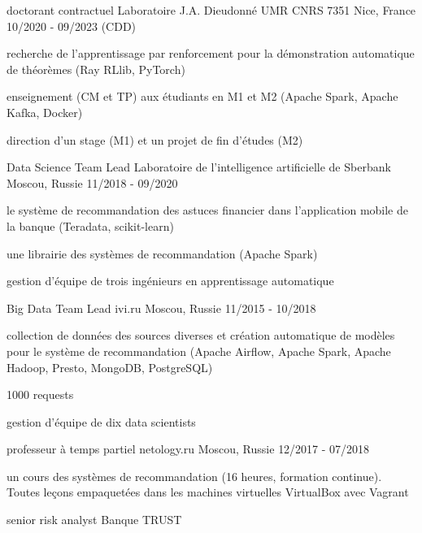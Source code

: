 \begin{cventries}
  \cventry
    {doctorant contractuel}
    {Laboratoire J.A. Dieudonné UMR CNRS 7351}
    {Nice, France}
    {10/2020 - 09/2023 (CDD)}
    {
      \begin{cvitems}
        \item {recherche de l'apprentissage par renforcement pour la démonstration automatique de théorèmes (Ray RLlib, PyTorch)}
        \item {enseignement (CM et TP) aux étudiants en M1 et M2 (Apache Spark, Apache Kafka, Docker)}
        \item {direction d'un stage (M1) et un projet de fin d'études (M2)}
      \end{cvitems}
    }
  \cventry
    {Data Science Team Lead}
    {Laboratoire de l'intelligence artificielle de Sberbank}
    {Moscou, Russie}
    {11/2018 - 09/2020}
    {
      \begin{cvitems}
        \item {le système de recommandation des astuces financier dans l'application mobile de la banque (Teradata, scikit-learn)}
        \item {une librairie des systèmes de recommandation (Apache Spark)}
        \item {gestion d'équipe de trois ingénieurs en apprentissage automatique}
      \end{cvitems}
    }
  \cventry
    {Big Data Team Lead}
    {ivi.ru}
    {Moscou, Russie}
    {11/2015 - 10/2018}
    {
      \begin{cvitems}
        \item {collection de données des sources diverses et création automatique de modèles pour le système de recommandation (Apache Airflow, Apache Spark, Apache Hadoop, Presto, MongoDB, PostgreSQL)}
        \item {1000 requests}
        \item {gestion d'équipe de dix data scientists}
      \end{cvitems}
    }
  \cventry
    {professeur à temps partiel}
    {netology.ru}
    {Moscou, Russie}
    {12/2017 - 07/2018}
    {
      \begin{cvitems}
        \item {un cours des systèmes de recommandation (16 heures, formation continue). Toutes leçons empaquetées dans les machines virtuelles VirtualBox avec Vagrant}
      \end{cvitems}
    }
  \cventry
    {senior risk analyst}
    {Banque TRUST}

\end{cventries}
